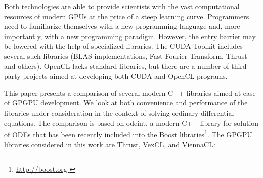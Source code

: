 \documentclass[final]{siamltex}
\begin{document}
Both technologies are able to provide scientists with the vast computational
resources of modern GPUs at the price of a steep learning curve.
Programmers need to familiarize
themselves with a new programming language and, more importantly, with a
new programming paradigm. However, the entry barrier may be lowered with the help of
specialized libraries. The CUDA Toolkit includes several such libraries (BLAS
implementations, Fast Fourier Transform, Thrust and others). OpenCL lacks
standard libraries, but there are a number of third-party projects aimed at
developing both CUDA and OpenCL programs.

This paper presents a comparison of several modern C++ libraries aimed
at ease of GPGPU development. We look at both convenience and
performance of the libraries under consideration in the context of
solving ordinary differential equations.  The comparison is based on
odeint, a modern C++ library for solution of ODEs that has been recently
included into the Boost libraries\footnote{ \href{ http://boost.org }
  { http://boost.org } }.  The GPGPU libraries considered in this work
are Thrust, VexCL, and ViennaCL:


\end{document}
